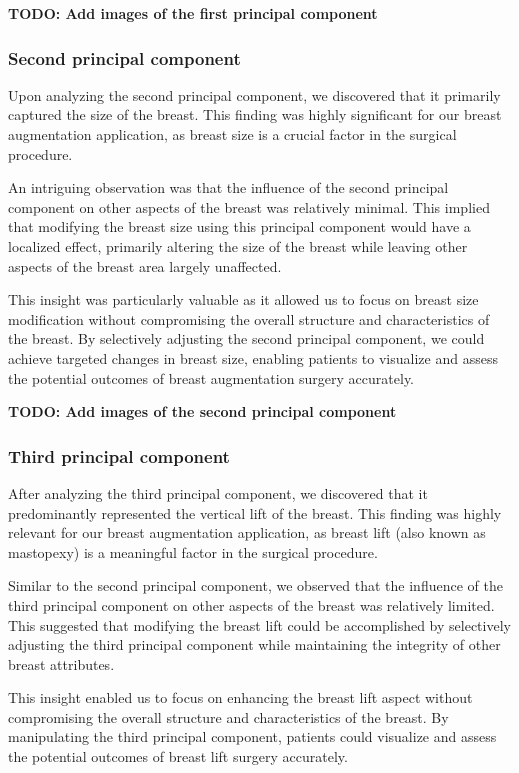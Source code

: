 \textbf{TODO: Add images of the first principal component}

\subsubsection{Second principal component}

Upon analyzing the second principal component, we discovered that it primarily captured the size of the breast. This finding was highly significant for our breast augmentation application, 
as breast size is a crucial factor in the surgical procedure.

An intriguing observation was that the influence of the second principal component on other aspects of the breast was relatively minimal. This implied that modifying the breast size 
using this principal component would have a localized effect, primarily altering the size of the breast while leaving other aspects of the breast area largely unaffected.

This insight was particularly valuable as it allowed us to focus on breast size modification without compromising the overall structure and characteristics of the breast. 
By selectively adjusting the second principal component, we could achieve targeted changes in breast size, enabling patients to visualize and assess the potential outcomes of breast augmentation surgery accurately.

\textbf{TODO: Add images of the second principal component}

\subsubsection{Third principal component}

After analyzing the third principal component, we discovered that it predominantly represented the vertical lift of the breast. This finding was highly relevant for our breast augmentation application, 
as breast lift (also known as mastopexy) is a meaningful factor in the surgical procedure.

Similar to the second principal component, we observed that the influence of the third principal component on other aspects of the breast was relatively limited. 
This suggested that modifying the breast lift could be accomplished by selectively adjusting the third principal component while maintaining the integrity of other breast attributes.

This insight enabled us to focus on enhancing the breast lift aspect without compromising the overall structure and characteristics of the breast. By manipulating the third principal component, 
patients could visualize and assess the potential outcomes of breast lift surgery accurately.

